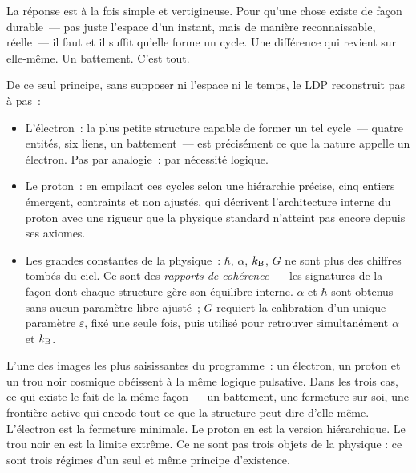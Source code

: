\documentclass[12pt, a4paper, openright]{book}
\begin{document}
\medskip

La réponse est à la fois simple et vertigineuse. Pour qu'une chose existe de façon durable~--- pas juste l'espace d'un instant, mais de manière reconnaissable, réelle~--- il faut et il suffit qu'elle forme un cycle. Une différence qui revient sur elle-même. Un battement. C'est tout.

\medskip

De ce seul principe, sans supposer ni l'espace ni le temps, le LDP reconstruit pas à pas~:

\begin{itemize}
\item L'électron~: la plus petite structure capable de former un tel cycle~--- quatre entités, six liens, un battement~--- est précisément ce que la nature appelle un électron. Pas par analogie~: par nécessité logique.
\item Le proton~: en empilant ces cycles selon une hiérarchie précise, cinq entiers émergent, contraints et non ajustés, qui décrivent l'architecture interne du proton avec une rigueur que la physique standard n'atteint pas encore depuis ses axiomes.
\item Les grandes constantes de la physique~: $\hbar$, $\alpha$, $k_{\rm B}$, $G$ ne sont plus des chiffres tombés du ciel. Ce sont des \emph{rapports de cohérence}~--- les signatures de la façon dont chaque structure gère son équilibre interne. $\alpha$ et $\hbar$ sont obtenus sans aucun paramètre libre ajusté~; $G$ requiert la calibration d'un unique paramètre $\varepsilon$, fixé une seule fois, puis utilisé pour retrouver simultanément $\alpha$ et $k_{\rm B}$.
\end{itemize}

L'une des images les plus saisissantes du programme~: un électron, un proton et un trou noir cosmique obéissent à la même logique pulsative. Dans les trois cas, ce qui existe le fait de la même façon --- un battement, une fermeture sur soi, une frontière active qui encode tout ce que la structure peut dire d'elle-même. L'électron est la fermeture minimale. Le proton en est la version hiérarchique. Le trou noir en est la limite extrême. Ce ne sont pas trois objets de la physique : ce sont trois régimes d'un seul et même principe d'existence.

\medskip
\end{document}
